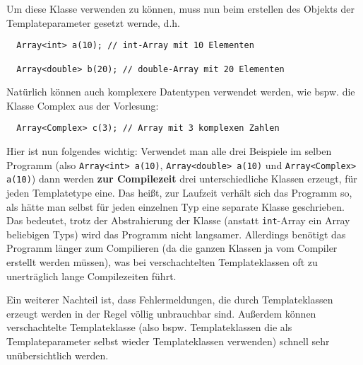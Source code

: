 \documentclass[
fontsize = 11pt,
paper    = a4,
BCOR     = 5mm,
DIV      = 12,
numbers  = noenddot,
]{scrartcl}
\begin{document}
Um diese Klasse verwenden zu können, muss nun beim erstellen des
Objekts der Templateparameter gesetzt wernde, d.h.
\begin{lstlisting}
  Array<int> a(10); // int-Array mit 10 Elementen

  Array<double> b(20); // double-Array mit 20 Elementen
\end{lstlisting}
Natürlich können auch komplexere Datentypen verwendet werden, wie
bspw. die Klasse Complex aus der Vorlesung:
\begin{lstlisting}
  Array<Complex> c(3); // Array mit 3 komplexen Zahlen
\end{lstlisting}
Hier ist nun folgendes wichtig: Verwendet man alle drei Beispiele im
selben Programm (also \lstinline|Array<int> a(10)|,
\lstinline|Array<double> a(10)| und \lstinline|Array<Complex> a(10)|)
dann werden \textbf{zur Compilezeit} drei unterschiedliche Klassen
erzeugt, für jeden Templatetype eine. Das heißt, zur Laufzeit verhält
sich das Programm so, als hätte man selbst für jeden einzelnen Typ
eine separate Klasse geschrieben.  Das bedeutet, trotz der
Abstrahierung der Klasse (anstatt \lstinline{int}-Array ein Array
beliebigen Typs) wird das Programm nicht langsamer. Allerdings
benötigt das Programm länger zum Compilieren (da die ganzen Klassen ja
vom Compiler erstellt werden müssen), was bei verschachtelten
Templateklassen oft zu unerträglich lange Compilezeiten führt.

Ein weiterer Nachteil ist, dass Fehlermeldungen, die durch Templateklassen
erzeugt werden in der Regel völlig unbrauchbar sind. Außerdem können
verschachtelte Templateklasse (also bspw. Templateklassen die als
Templateparameter selbst wieder Templateklassen verwenden) schnell
sehr unübersichtlich werden.
\end{document}

